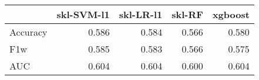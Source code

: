 \begin{tabular}{lrrrr}
\toprule
{} &  skl-SVM-l1 &  skl-LR-l1 &  skl-RF &  xgboost \\
\midrule
Accuracy &       0.586 &      0.584 &   0.566 &    0.580 \\
F1w      &       0.585 &      0.583 &   0.566 &    0.575 \\
AUC      &       0.604 &      0.604 &   0.600 &    0.604 \\
\bottomrule
\end{tabular}
